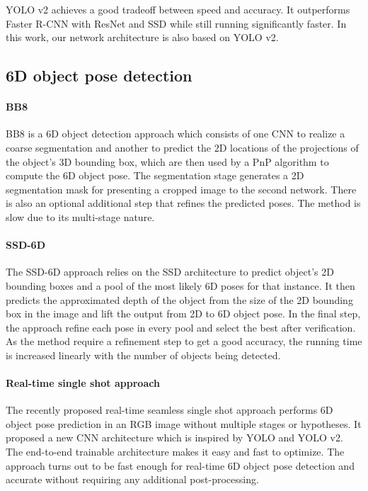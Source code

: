 YOLO v2 achieves a good tradeoff between speed and accuracy. It outperforms Faster R-CNN with ResNet and SSD while still running significantly faster. In this work, our network architecture is also based on YOLO v2.


\subsection{6D object pose detection}

\paragraph{BB8}
BB8 \cite{rad2017bb8} is a 6D object detection approach which consists of one CNN to realize a coarse segmentation and another to predict the 2D locations of the projections of the object’s 3D bounding box, which are then used by a PnP algorithm to compute the 6D object pose. The segmentation stage generates a 2D segmentation mask for presenting a cropped image to the second network. There is also an optional additional step that refines the predicted poses. The method is slow due to its multi-stage nature.

\paragraph{SSD-6D}
The SSD-6D \cite{kehl2017ssd} approach relies on the SSD architecture to predict object's 2D bounding boxes and a pool of the most likely 6D poses for that instance. It then predicts the approximated depth of the object from the size of the 2D bounding box in the image and lift the output from 2D to 6D object pose. In the final step, the approach refine each pose in every pool and select the best after verification. As the method require a refinement step to get a good accuracy, the running time is increased linearly with the number of objects being detected.

\paragraph{Real-time single shot approach}

The recently proposed real-time seamless single shot approach \cite{tekin2018real} performs 6D object pose prediction in an RGB image without multiple stages or hypotheses. It proposed a new CNN architecture which is inspired by YOLO and YOLO v2. The end-to-end trainable architecture makes it easy and fast to optimize. The approach turns out to be fast enough for real-time 6D object pose detection and accurate without requiring any additional post-processing.

